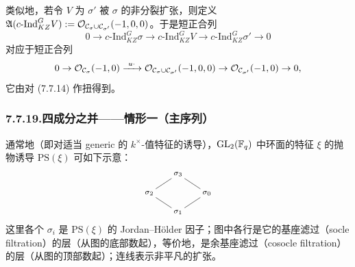 类似地，若令 $V$ 为 $\sigma'$ 被 $\sigma$ 的非分裂扩张，则定义 $\mathfrak A(c\text{-}\mathrm{Ind}^G_{KZ}V):=\mathcal{O}_{\mathcal{C}_\sigma\cup\mathcal{C}_{\sigma'}}(-1,0,0)$。于是短正合列
\[
0\to c\text{-}\mathrm{Ind}^G_{KZ}\sigma\to c\text{-}\mathrm{Ind}^G_{KZ}V\to c\text{-}\mathrm{Ind}^G_{KZ}\sigma'\to0
\]
对应于短正合列
\[
0\to\OO_{\CC_\sigma}(-1,0)\xrightarrow{\ u\cdot\ }\OO_{\CC_\sigma\cup\CC_{\sigma'}}(-1,0,0)\to\OO_{\CC_{\sigma'}}(-1,0)\to0,
\]
它由对 (7.7.14) 作扭得到。

\subsubsection*{7.7.19.\quad 四成分之并——情形一（主序列）}
通常地（即对适当 generic 的 $k^\times$-值特征的诱导），$\mathrm{GL}_2(\mathbb{F}_q)$ 中环面的特征 $\xi$ 的抛物诱导 $\mathrm{PS}(\xi)$ 可如下示意：
\[
\begin{tikzpicture}[baseline=(current bounding box.center),every node/.style={font=\footnotesize, inner sep=2pt}]
\node (t) at (0,1.4) {$\sigma_3$};
\node (l) at (-1.05,0.7) {$\sigma_2$};
\node (r) at (1.05,0.7) {$\sigma_0$};
\node (b) at (0,0) {$\sigma_1$};
\draw (t)--(l); \draw (t)--(r); \draw (l)--(b); \draw (r)--(b);
\end{tikzpicture}
\]
这里各个 $\sigma_i$ 是 $\mathrm{PS}(\xi)$ 的 Jordan--Hölder 因子；图中各行是它的基座滤过（socle filtration）的层（从图的底部数起），等价地，是余基座滤过（cosocle filtration）的层（从图的顶部数起）；连线表示非平凡的扩张。

